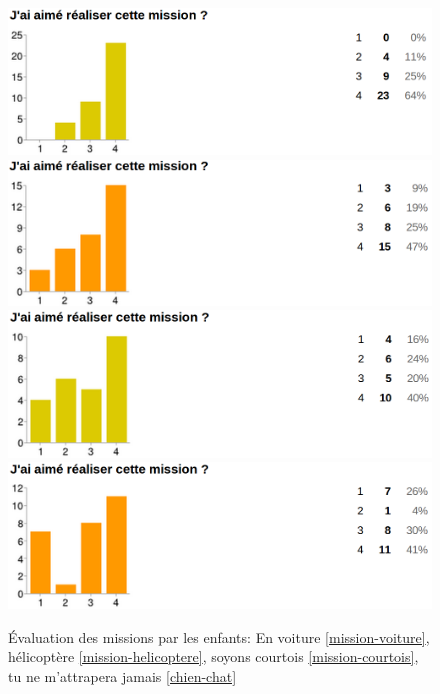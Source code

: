 \begin{figure}[ht]
  \begin{center}
    \includegraphics[scale=0.3]{content/8-validation/images/voiture}
    \includegraphics[scale=0.3]{content/8-validation/images/helico}
    \includegraphics[scale=0.3]{content/8-validation/images/courtois}
    \includegraphics[scale=0.3]{content/8-validation/images/chien}
    \caption{Évaluation des missions par les enfants: En voiture \ref{mission-voiture}, hélicoptère \ref{mission-helicoptere}, soyons courtois \ref{mission-courtois}, tu ne m'attrapera jamais \ref{chien-chat}}
    \label{fig:evaluation-mission}
  \end{center}
\end{figure}

